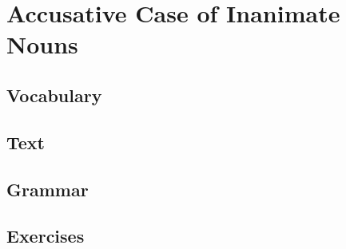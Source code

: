 \chapter{Accusative Case of Inanimate Nouns}
\section*{Vocabulary}
\section*{Text}
\section*{Grammar}
\section*{Exercises}
